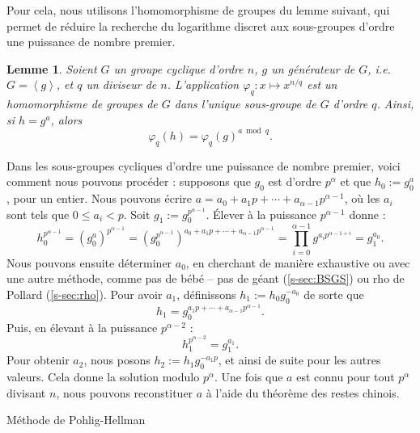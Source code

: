 \documentclass[a4paper, titlepage, 11pt]{article}
\newtheorem{lemm}[theo]{Lemme}
\theoremstyle{definition}
\theoremstyle{remark}
\def\gen #1{\left\langle#1\right\rangle}
\begin{document}
Pour cela, nous utilisons l'homomorphisme de groupes du lemme suivant, qui permet de réduire la recherche du logarithme discret aux sous-groupes d'ordre une puissance de nombre premier.

\begin{lemm}
Soient $G$ un groupe cyclique d'ordre $n$, $g$ un générateur de $G$, i.e. $G = \gen{g}$, et $q$ un diviseur de $n$. L'application $\varphi_q : x \mapsto x^{n/q}$ est un homomorphisme de groupes de $G$ dans l'unique sous-groupe de $G$ d'ordre $q$. Ainsi, si $h = g^a$, alors $$\varphi_q(h) = \varphi_q(g)^{a \bmod{q}}.$$
\end{lemm}

Dans les sous-groupes cycliques d'ordre une puissance de nombre premier, voici comment nous pouvons procéder : supposons que $g_0$ est d'ordre $p^\alpha$ et que $h_0 := g_0^a$, pour un entier. Nous pouvons écrire $a = a_0 + a_1 p + \cdots + a_{\alpha-1}p^{\alpha-1}$, où les $a_i$ sont tels que $0\leqslant a_i < p$. Soit $g_1 := g_0^{p^{\alpha-1}}$. \'Elever à la puissance $p^{\alpha-1}$ donne :
$$h_0^{p^{\alpha-1}} = {(g_0^a)}^{p^{\alpha-1}} = {\left(g_0^{p^{\alpha-1}}\right)}^{a_0 + a_1 p + \cdots + a_{\alpha-1}p^{\alpha-1}} = \prod_{i=0}^{\alpha -1 } g^{a_ip^{\alpha-1+i}} = g_1^{a_0}.$$
Nous pouvons ensuite déterminer $a_0$, en cherchant de manière exhaustive ou avec une autre méthode, comme pas de bébé -- pas de géant (\ref{s-sec:BSGS}) ou rho de Pollard (\ref{s-sec:rho}).
Pour avoir $a_1$, définissons $h_1 := h_0g_0^{-a_0}$ de sorte que
$$h_1 = g_0^{a_1 p + \cdots + a_{\alpha-1}p^{\alpha-1}}.$$
Puis, en élevant à la puissance $p^{\alpha-2}$ :
$$h_1^{p^{\alpha-2}} = g_1^{a_1}.$$
Pour obtenir $a_2$, nous posons $h_2 := h_1g_0^{-a_1p}$, et ainsi de suite pour les autres valeurs. Cela donne la solution modulo $p^\alpha$.
Une fois que $a$ est connu pour tout $p^\alpha$ divisant $n$, nous pouvons reconstituer $a$ à l'aide du théorème des restes chinois.

\begin{algorithm}[h]
\caption{Méthode de Pohlig-Hellman}
\label{algo:pohligHellman}
\begin{algorithmic}[1]
\REQUIRE{$g$ d'ordre $n$, $h \in \gen{g}$ et ${(p_i,\alpha_i)}_{1\leqslant i \leqslant r}$ tel que $n = \prod p_i^{\alpha_i}$}
	\ENDFOR
\ENDFOR
{}
\end{algorithmic}
\end{algorithm}
\end{document}
